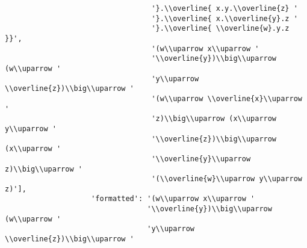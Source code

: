 \begin{verbatim}
                                  '}.\\overline{ x.y.\\overline{z} '
                                  '}.\\overline{ x.\\overline{y}.z '
                                  '}.\\overline{ \\overline{w}.y.z }}',
                                  '(w\\uparrow x\\uparrow '
                                  '\\overline{y})\\big\\uparrow (w\\uparrow '
                                  'y\\uparrow \\overline{z})\\big\\uparrow '
                                  '(w\\uparrow \\overline{x}\\uparrow '
                                  'z)\\big\\uparrow (x\\uparrow y\\uparrow '
                                  '\\overline{z})\\big\\uparrow (x\\uparrow '
                                  '\\overline{y}\\uparrow z)\\big\\uparrow '
                                  '(\\overline{w}\\uparrow y\\uparrow z)'],
                    'formatted': '(w\\uparrow x\\uparrow '
                                 '\\overline{y})\\big\\uparrow (w\\uparrow '
                                 'y\\uparrow \\overline{z})\\big\\uparrow '

\end{verbatim}
